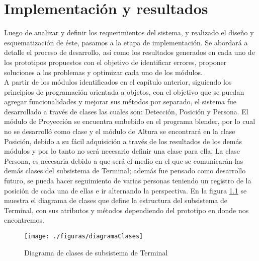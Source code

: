 \documentclass[a4paper,openright,12pt]{report}
\begin{document}
\chapter{Implementación y resultados}\label{cap.implementacionyresultados}
Luego de analizar y definir los requerimientos del sistema, y realizado el diseño y esquematización de éste, pasamos a la etapa de implementación. Se abordará a detalle el proceso de desarrollo, así como los resultados generados en cada uno de los prototipos propuestos con el objetivo de identificar errores, proponer soluciones a los problemas y optimizar cada uno de los módulos.\\
A partir de los módulos identificados en el capítulo anterior, siguiendo los principios de programación orientada a objetos, con el objetivo que se puedan agregar funcionalidades y mejorar sus métodos por separado, el sistema fue desarrollado a través de clases las cuales son: Detección, Posición y Persona. El módulo de Proyección se encuentra embebido en el programa blender, por lo cual no se desarrolló como clase y el módulo de Altura se encontrará en la clase Posición, debido a su fácil adquisición a través de los resultados de los demás módulos y por lo tanto no será necesario definir una clase para ella. La clase Persona, es necesaria debido a que será el medio en el que se comunicarán las demás clases del subsistema de Terminal; además fue pensado como desarrollo futuro, se pueda hacer seguimiento de varias personas teniendo un registro de la posición de cada una de ellas e ir alternando la perspectiva. En la figura \ref{fig:diagramaClases} se muestra el diagrama de clases que define la estructura del subsistema de Terminal, con sus atributos y métodos dependiendo del prototipo en donde nos encontremos.\\

\begin{figure}[th]
	\centering
	\texttt{[image: ./figuras/diagramaClases]}
	\caption{Diagrama de clases de subsistema de Terminal} \label{fig:diagramaClases}
\end{figure}
\end{document}
